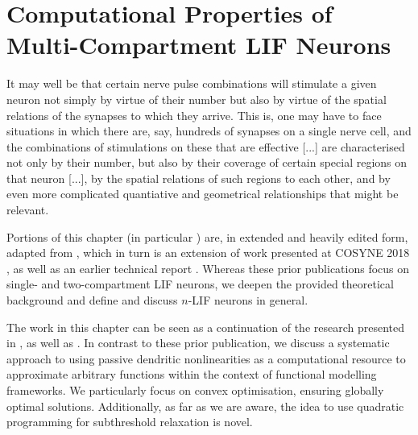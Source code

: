 \chapter{Computational Properties of Multi-Compartment LIF Neurons}

\begin{OpeningQuote}
It may well be that certain nerve pulse combinations will stimulate a given neuron not simply by virtue of their number but also by virtue of the spatial relations of the synapses to which they arrive. This is, one may have to face situations in which there are, say, hundreds of synapses on a single nerve cell, and the combinations of stimulations on these that are effective [...] are characterised not only by their number, but also by their coverage of certain special regions on that neuron [...], by the spatial relations of such regions to each other, and by even more complicated quantiative and geometrical relationships that might be relevant.
\end{OpeningQuote}

\begin{PriorPublication}
Portions of this chapter (in particular ) are, in extended and heavily edited form, adapted from \citet{stoeckel2021}, which in turn is an extension of work presented at COSYNE 2018 \citep{stockel2018nonlinear}, as well as an earlier technical report \citep{stockel2017point}.
Whereas these prior publications focus on single- and two-compartment LIF neurons, we deepen the provided theoretical background and define and discuss $n$-LIF neurons in general.
\end{PriorPublication}

\begin{Contributions}
The work in this chapter can be seen as a continuation of the research presented in \citet[Chapter~5]{koch1999biophysics}, as well as \citet[Chapter~4]{tripp2009search}.
In contrast to these prior publication, we discuss a systematic approach to using passive dendritic nonlinearities as a computational resource to approximate arbitrary functions within the context of functional modelling frameworks.
We particularly focus on convex optimisation, ensuring globally optimal solutions.
Additionally, as far as we are aware, the idea to use quadratic programming for subthreshold relaxation is novel.
\end{Contributions}

